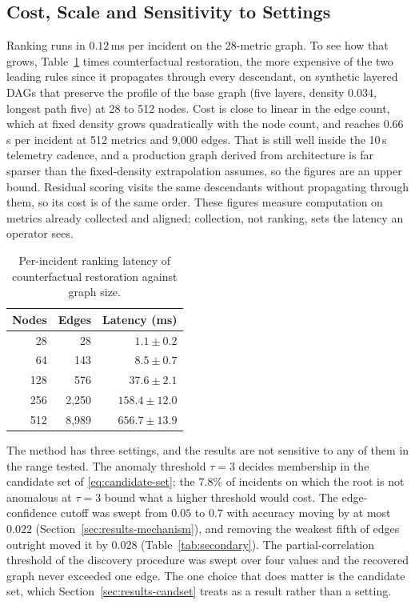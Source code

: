 \documentclass[conference]{IEEEtran}
\begin{document}
\subsection{Cost, Scale and Sensitivity to Settings}
\label{sec:results-cost}
Ranking runs in $0.12$\,ms per incident on the 28-metric graph. To see how that grows, Table~\ref{tab:scaling} times counterfactual restoration, the more expensive of the two leading rules since it propagates through every descendant, on synthetic layered DAGs that preserve the profile of the base graph (five layers, density $0.034$, longest path five) at 28 to 512 nodes. Cost is close to linear in the edge count, which at fixed density grows quadratically with the node count, and reaches $0.66$\,s per incident at 512 metrics and 9{,}000 edges. That is still well inside the 10\,s telemetry cadence, and a production graph derived from architecture is far sparser than the fixed-density extrapolation assumes, so the figures are an upper bound. Residual scoring visits the same descendants without propagating through them, so its cost is of the same order. These figures measure computation on metrics already collected and aligned; collection, not ranking, sets the latency an operator sees.

\begin{table}[htbp]
\centering
\caption{Per-incident ranking latency of counterfactual restoration against graph size.}
\label{tab:scaling}
\begin{tabular}{rrr}
\toprule
\textbf{Nodes} & \textbf{Edges} & \textbf{Latency (ms)} \\
\midrule
 28 &    28 &   $1.1 \pm 0.2$ \\
 64 &   143 &   $8.5 \pm 0.7$ \\
128 &   576 &  $37.6 \pm 2.1$ \\
256 & 2{,}250 & $158.4 \pm 12.0$ \\
512 & 8{,}989 & $656.7 \pm 13.9$ \\
\bottomrule
\end{tabular}
\end{table}

The method has three settings, and the results are not sensitive to any of them in the range tested. The anomaly threshold $\tau=3$ decides membership in the candidate set of \eqref{eq:candidate-set}; the $7.8\%$ of incidents on which the root is not anomalous at $\tau=3$ bound what a higher threshold would cost. The edge-confidence cutoff was swept from $0.05$ to $0.7$ with accuracy moving by at most $0.022$ (Section~\ref{sec:results-mechanism}), and removing the weakest fifth of edges outright moved it by $0.028$ (Table~\ref{tab:secondary}). The partial-correlation threshold of the discovery procedure was swept over four values and the recovered graph never exceeded one edge. The one choice that does matter is the candidate set, which Section~\ref{sec:results-candset} treats as a result rather than a setting.
\end{document}
